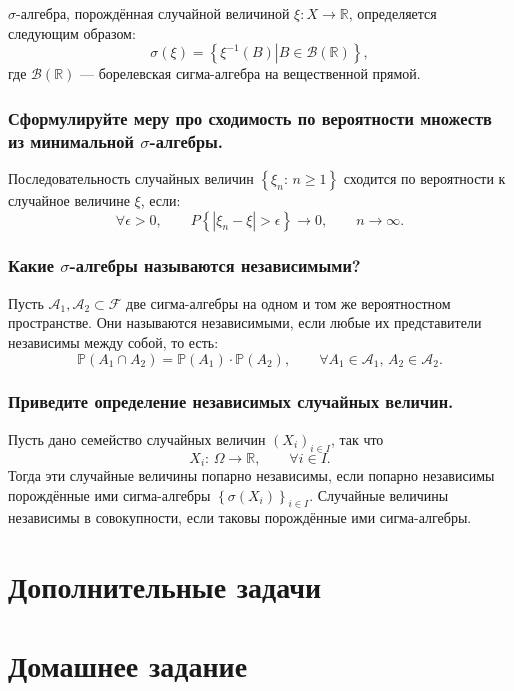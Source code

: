 $ \sigma $-алгебра, порождённая случайной величиной $ \xi: X \rightarrow \mathbb{R} $, определяется следующим образом:
$$ \sigma \left( \xi \right) =
\left\{ \left. \xi^{-1} \left( B \right) \right| B \in \mathcal{B} \left( \mathbb{R} \right) \right\},$$
где $ \mathcal{B} \left( \mathbb{R} \right) $ --- борелевская сигма-алгебра на вещественной прямой.

\subsubsection*{Сформулируйте меру про сходимость по вероятности множеств из минимальной $ \sigma $-алгебры.}

Последовательность случайных величин $ \left\{ \xi_n: \, n \geq 1 \right\} $ сходится по вероятности к случайное величине $ \xi $, если:
$$ \forall \epsilon > 0, \qquad
P \left\{ \left| \xi_n - \xi \right| > \epsilon \right\} \rightarrow 0, \qquad
n \rightarrow \infty.$$

\subsubsection*{Какие $ \sigma $-алгебры называются независимыми?}

Пусть $ \mathcal{A}_1, \mathcal{A}_2 \subset \mathcal{F} $ две сигма-алгебры на одном и том же вероятностном пространстве.
Они называются независимыми, если любые их представители независимы между собой, то есть:
$$ \mathbb{P} \left( A_1 \cap A_2 \right) =
\mathbb{P} \left( A_1 \right) \cdot \mathbb{P} \left( A_2 \right), \qquad
\forall A_1 \in \mathcal{A}_1, \,
A_2 \in \mathcal{A}_2.$$

\subsubsection*{Приведите определение независимых случайных величин.}

Пусть дано семейство случайных величин $ \left( X_i \right)_{i \in I} $,
так что
$$X_i: \,
\Omega \rightarrow \mathbb{R}, \qquad
\forall i \in I.$$
Тогда эти случайные величины попарно независимы,
если попарно независимы порождённые ими сигма-алгебры $ \left\{ \sigma \left( X_i \right) \right\}_{i \in I} $.
Случайные величины независимы в совокупности, если таковы порождённые ими сигма-алгебры.

\section*{Дополнительные задачи}

\section*{Домашнее задание}
